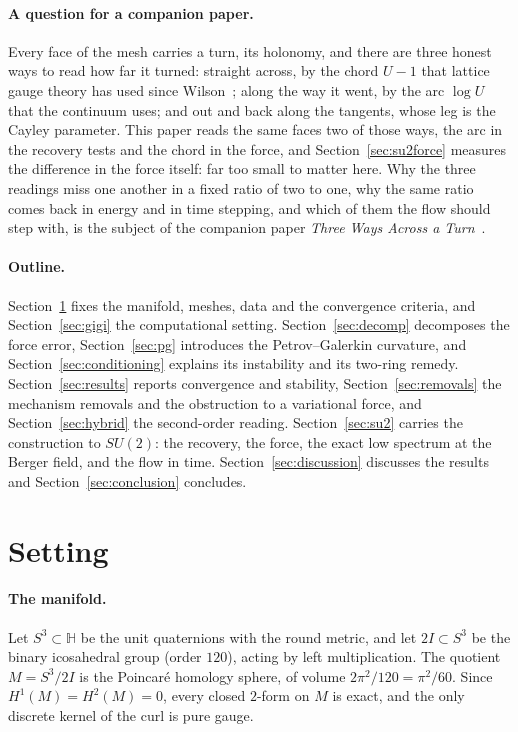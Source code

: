 \documentclass[11pt]{article}
\theoremstyle{definition}
\theoremstyle{remark}
\newcommand{\Hb}{\mathbb{H}}
\begin{document}
\paragraph{A question for a companion paper.} Every face of the mesh carries a turn, its
holonomy, and there are three honest ways to read how far it turned: straight across, by
the chord $U-1$ that lattice gauge theory has used since Wilson~\cite{wilson1974}; along the way it went, by
the arc $\log U$ that the continuum uses; and out and back along the tangents, whose leg is
the Cayley parameter. This paper reads the same faces two of those ways, the arc in the recovery tests and
the chord in the force, and Section~\ref{sec:su2force} measures the difference in the force
itself: far too small to matter here. Why the three readings miss one another in a
fixed ratio of two to one, why the same ratio comes back in energy and in time stepping,
and which of them the flow should step with, is the subject of the companion paper
\emph{Three Ways Across a Turn}~\cite{threeways}.

\paragraph{Outline.} Section~\ref{sec:setting} fixes the manifold, meshes, data and the
convergence criteria, and Section~\ref{sec:gigi} the computational setting.
Section~\ref{sec:decomp} decomposes the force error, Section~\ref{sec:pg} introduces the
Petrov--Galerkin curvature, and Section~\ref{sec:conditioning} explains its instability and its
two-ring remedy. Section~\ref{sec:results} reports convergence and stability,
Section~\ref{sec:removals} the mechanism removals and the obstruction to a variational force, and
Section~\ref{sec:hybrid} the second-order reading. Section~\ref{sec:su2} carries the construction to
$SU(2)$: the recovery, the force, the exact low spectrum at the Berger field, and the flow in time.
Section~\ref{sec:discussion} discusses the results and Section~\ref{sec:conclusion} concludes.

\section{Setting}\label{sec:setting}

\paragraph{The manifold.}
Let $S^3\subset\Hb$ be the unit quaternions with the round metric, and let
$2I\subset S^3$ be the binary icosahedral group (order $120$), acting by left
multiplication. The quotient $M=S^3/2I$ is the Poincar\'e homology sphere, of volume
$2\pi^2/120=\pi^2/60$. Since $H^1(M)=H^2(M)=0$, every closed $2$-form on $M$ is exact,
and the only discrete kernel of the curl is pure gauge.
\end{document}
